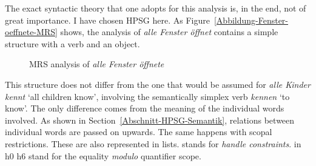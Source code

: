 The exact syntactic theory that one adopts for this analysis is, in the end, not of great importance.
I have chosen HPSG here. As Figure~\vref{Abbildung-Fenster-oeffnete-MRS} shows, the analysis of \emph{alle Fenster öffnet}
contains a simple structure with a verb and an object.
\begin{figure}[t]
\caption{\label{Abbildung-Fenster-oeffnete-MRS}MRS analysis of \emph{alle Fenster öffnete}}
\end{figure}%
This structure does not differ from the one that would be assumed for \emph{alle Kinder kennt} `all
children know', involving the semantically simplex verb \emph{kennen} `to know'.
The only difference comes from the meaning of the individual words involved.
As shown in Section~\ref{Abschnitt-HPSG-Semantik}, relations between individual words are passed on upwards.
The same happens with scopal restrictions. These are also represented in lists. \hcons stands for \emph{handle constraints}.
\qeq in h0 \qeq h6 stand for the equality \emph{modulo} quantifier scope.

